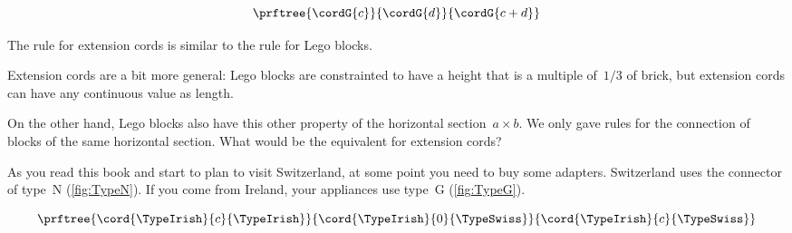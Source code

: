 \begin{equation}
  \label{eq:cords}
  \prftree{\cordG{c}}{\cordG{d}}{\cordG{c+d}}
\end{equation}

The rule for extension cords is similar to the rule for Lego blocks.
%


Extension cords are a bit more general: Lego blocks are constrainted to have a height that is a multiple of~$1/3$ of brick,  but extension cords can have any continuous value as length.

On the other hand, Lego blocks also have this other property of the horizontal section~$a \times b$.
We only gave rules for the connection of blocks of the same horizontal section.
What would be the equivalent for extension cords?


As you read this book and start to plan to visit Switzerland, at some point you need to buy some adapters.
Switzerland uses the connector of type~N (\cref{fig:TypeN}).
If you come from Ireland, your appliances use type~G (\cref{fig:TypeG}).

\begin{equation}
  \label{eq:irish-swiss}
  \prftree{\cord{\TypeIrish}{c}{\TypeIrish}}{\cord{\TypeIrish}{0}{\TypeSwiss}}{\cord{\TypeIrish}{c}{\TypeSwiss}}
\end{equation}

